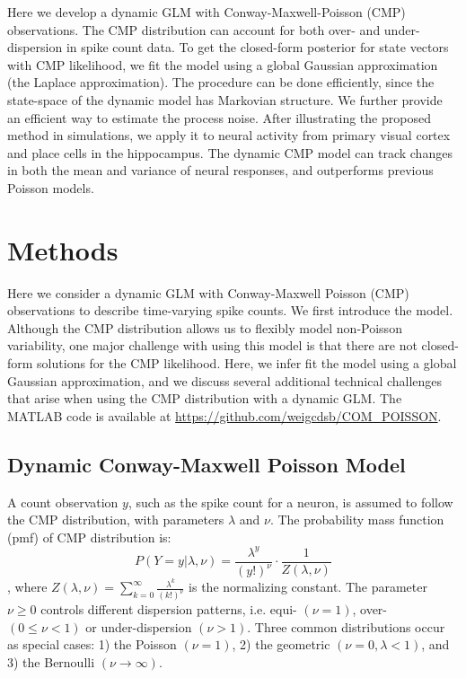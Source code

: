 \documentclass[aoas]{imsart}
\theoremstyle{plain}
\theoremstyle{remark}
\begin{document}
Here we develop a dynamic GLM with Conway-Maxwell-Poisson (CMP) observations. The CMP distribution can account for both over- and under-dispersion in spike count data. To get the closed-form posterior for state vectors with CMP likelihood, we fit the model using a global Gaussian approximation (the Laplace approximation). The procedure can be done efficiently, since the state-space of the dynamic model has Markovian structure. We further provide an efficient way to estimate the process noise. After illustrating the proposed method in simulations, we apply it to neural activity from primary visual cortex and place cells in the hippocampus. The dynamic CMP model can track changes in both the mean and variance of neural responses, and outperforms previous Poisson models.

\section{Methods}
Here we consider a dynamic GLM with Conway-Maxwell Poisson (CMP) observations to describe time-varying spike counts. We first introduce the model. Although the CMP distribution allows us to flexibly model non-Poisson variability, one major challenge with using this model is that there are not closed-form solutions for the CMP likelihood. Here, we infer fit the model using a global Gaussian approximation, and we discuss several additional technical challenges that arise when using the CMP distribution with a dynamic GLM. The MATLAB code is available at \url{https://github.com/weigcdsb/COM_POISSON}. 

\subsection{Dynamic Conway-Maxwell Poisson Model}
A count observation $y$, such as the spike count for a neuron, is assumed to follow the CMP distribution, with parameters $\lambda$ and $\nu$. The probability mass function (pmf) of CMP distribution is:
\begin{equation}
	P(Y=y|\lambda, \nu) = \frac{\lambda^y}{(y!)^\nu}\cdot\frac{1}{Z(\lambda, \nu)}
\end{equation}
, where $Z(\lambda, \nu)=\sum_{k=0}^{\infty}\frac{\lambda^k}{(k!)^\nu}$ is the normalizing constant. The parameter $\nu \geq 0$ controls different dispersion patterns, i.e. equi- $(\nu=1)$, over- $(0\leq\nu<1)$ or under-dispersion $(\nu > 1)$. Three common distributions occur as special cases: 1) the Poisson $(\nu=1)$, 2) the geometric $(\nu=0, \lambda<1)$, and 3) the Bernoulli $(\nu \rightarrow \infty)$.
\end{document}
